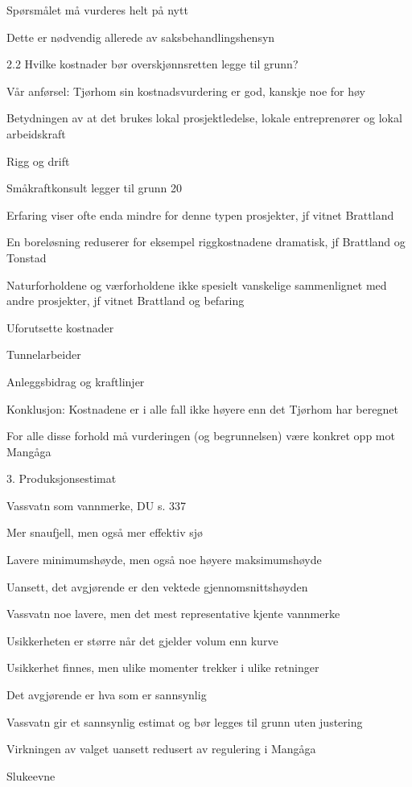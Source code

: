 \documentclass[12pt,a4paper]{article} %
\begin{document}
	Spørsmålet må vurderes helt på nytt

	Dette er nødvendig allerede av saksbehandlingshensyn

2.2	Hvilke kostnader bør overskjønnsretten legge til grunn?

	Vår anførsel: Tjørhom sin kostnadsvurdering er god, kanskje noe for høy

	Betydningen av at det brukes lokal prosjektledelse, lokale entreprenører og lokal arbeidskraft	

	Rigg og drift

	Småkraftkonsult legger til grunn 20 %
	
	Erfaring viser ofte enda mindre for denne typen prosjekter, jf vitnet Brattland

	En boreløsning reduserer for eksempel riggkostnadene dramatisk, jf Brattland og Tonstad

	Naturforholdene og værforholdene ikke spesielt vanskelige sammenlignet med andre prosjekter, jf vitnet Brattland og befaring

	Uforutsette kostnader	

	Tunnelarbeider

	Anleggsbidrag og kraftlinjer

	Konklusjon: Kostnadene er i alle fall ikke høyere enn det Tjørhom har beregnet

	For alle disse forhold må vurderingen (og begrunnelsen) være konkret opp mot Mangåga

3.	Produksjonsestimat

	Vassvatn som vannmerke, DU s. 337

	Mer snaufjell, men også mer effektiv sjø

	Lavere minimumshøyde, men også noe høyere maksimumshøyde

	Uansett, det avgjørende er den vektede gjennomsnittshøyden

	Vassvatn noe lavere, men det mest representative kjente vannmerke

	Usikkerheten er større når det gjelder volum enn kurve		

	Usikkerhet finnes, men ulike momenter trekker i ulike retninger

	Det avgjørende er hva som er sannsynlig

	Vassvatn gir et sannsynlig estimat og bør legges til grunn uten justering

	Virkningen av valget uansett redusert av regulering i Mangåga

	Slukeevne
\end{document}
